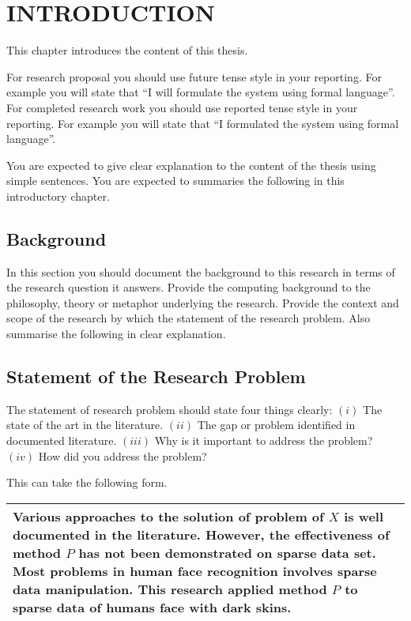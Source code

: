 \chapter{\large INTRODUCTION}
\thispagestyle{empty}
\setcounter{page}{1}

This chapter introduces the content of this thesis.

For research proposal you should use future tense style in your reporting. For example you will state that ``I will formulate the system using formal language''.  For completed research work you should use reported tense  style in your reporting. For example you will state that ``I formulated the system using formal language''.  

You are expected to give clear explanation to the content of the thesis using simple sentences. You are expected to summaries the following in this introductory chapter.

\section{Background}
In this section you should document the background to this research in terms of the research question it answers. Provide the computing background to the philosophy, theory or metaphor underlying the research. Provide the context and scope of the research by which the statement of the research problem. Also summarise the following in clear explanation.

\section{Statement of the Research Problem}

The statement of research problem should state four things clearly: $(i)$ The state of the art in the literature.  $(ii)$ The gap or problem identified in documented literature. $(iii)$ Why is it important to address the problem? $(iv)$ How did you address the problem? 

This can take the following form. 

\vspace*{3mm}

\begin{tabular}{||p{14cm}||} \hline
Various approaches to the solution of problem of $X$ is well documented in the literature. However, the effectiveness of method $P$ has not been demonstrated on sparse data set. Most problems in human face recognition involves sparse data manipulation. This research applied method $P$ to sparse data of humans face with dark skins. \\ \hline 
\end{tabular}


